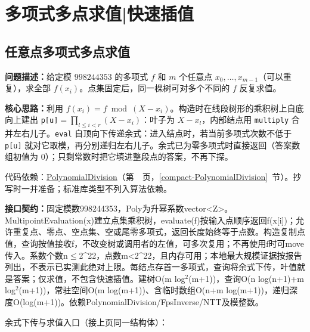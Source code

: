 \Needspace{592pt}

\section{多项式多点求值|快速插值}

\subsection{任意点多项式多点求值}\label{compact-MultipointEvaluation}

\noindent\textbf{问题描述：}\allowbreak 给定模 $998244353$ 的多项式 $f$ 和 $m$ 个任意点 $x_0,\dots,x_{m-1}$（可以重复），求全部 $f(x_i)$。点集固定后，同一棵树可对多个不同的 $f$ 反复求值。

\textbf{核心思路：}\allowbreak 利用 $f(x_i)=f\bmod(X-x_i)$。构造时在线段树形的乘积树上自底向上建出 \texttt{p[u]}$=\prod_{l\le i<r}(X-x_i)$：叶子为 $X-x_l$，内部结点用 \texttt{multiply} 合并左右儿子。\texttt{eval} 自顶向下传递余式：进入结点时，若当前多项式次数不低于 \texttt{p[u]} 就对它取模，再分别递归左右儿子。余式已为零多项式时直接返回（答案数组初值为 0）；只剩常数时把它填进整段点的答案，不再下探。

代码依赖：\hyperref[compact-PolynomialDivision]{PolynomialDivision}（第~\pageref{compact-PolynomialDivision}~页，\ref{compact-PolynomialDivision}~节）。抄写时一并准备；标准库类型不列入算法依赖。

{\sloppy{}\noindent\textbf{接口契约：}固定模数998244353，Poly为升幂系数vector<Z>。MultipointEvaluation(x)建立点集乘积树，evaluate(f)按输入点顺序返回f(x[i])；允许重复点、零点、空点集、空或尾零多项式，返回长度始终等于点数。构造复制点值，查询按值接收f，不改变树或调用者的左值，可多次复用；不再使用f时可move传入。系数个数n$\le$2\textasciicircum{}22，点数m<2\textasciicircum{}22，且内存可用；本地最大规模证据按报告列出，不表示已实测此绝对上限。每结点存首一多项式，查询将余式下传，叶值就是答案；仅求值，不包含快速插值。建树O(m log$^{2}$(m+1))，查询O(n log(n+1)+m log$^{2}$(m+1))，常驻空间O(m log(m+1))、含临时数组O(n+m log(m+1))，递归深度O(log(m+1))。依赖PolynomialDivision/FpsInverse/NTT及模整数。\par}

\Needspace{373pt}



\newpage

\noindent 余式下传与求值入口（接上页同一结构体）：


